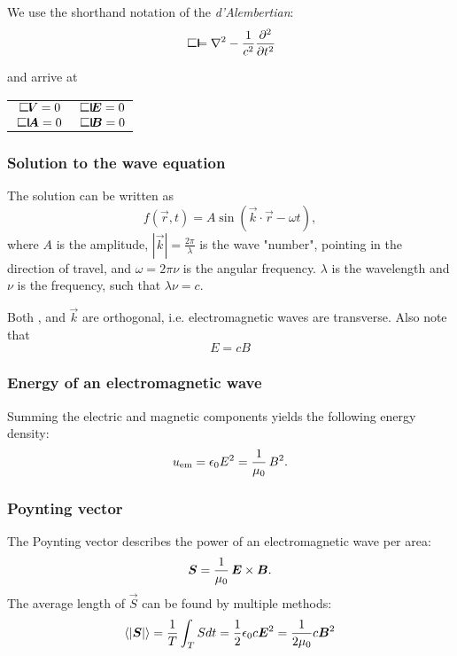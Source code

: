         We use the shorthand notation of the \textit{d'Alembertian}: 
        \begin{equation*}
            \dalambert = \nabla^2 - \frac{1}{c^2}\frac{\partial^2}{\partial t^2}
        \end{equation*}

        and arrive at
        \begin{center}
            \begin{tabular}{ c|c }
                $\dalambert V = 0$&$ \dalambert\,\E = 0$\\
                $\dalambert\,\vec{A} = 0 $&$\dalambert\,\B = 0$
            \end{tabular}
        \end{center}
    \subsubsection{Solution to the wave equation}
        The solution  can be written as
        \begin{equation*}
            f(\vec{r}, t) = A\sin\left(\vec{k}\cdot\vec{r} - \omega t\right),
        \end{equation*}
        where $A$ is the amplitude, $|\vec{k}| = \frac{2\pi}{\lambda}$ is the wave "number", pointing in the direction of travel, 
        and $\omega = 2\pi\nu$ is the angular frequency. $\lambda$ is the wavelength and $\nu$ is the frequency, such that
        $\lambda\nu = c$.

        Both \E, \B{} and $\vec{k}$ are orthogonal, i.e. electromagnetic waves are transverse. Also note that 
        \begin{equation}
            E = cB
        \end{equation}

    \subsubsection{Energy of an electromagnetic wave}
        Summing the electric and magnetic components yields the following energy density: 
        \begin{equation}
            u_{\text{em}} = \epsilon_0 E^2 = \frac{1}{\mu_0}\, B^2.
        \end{equation}
    
    \subsubsection{Poynting vector}
        The Poynting vector describes the power of an electromagnetic wave per area:
        \begin{equation}
            \bm{S} = \frac{1}{\mu_0}\,\bm{E}\times\bm{B}.
        \end{equation}
        The average length of $\vec{S}$ can be found by multiple methods:
        \begin{equation}
            \left<|\vec{S}|\right> = \frac{1}{T}\int_T Sdt = \frac{1}{2}\e c\E^2 = \frac{1}{2\mu_0}c\B^2
        \end{equation}
    
